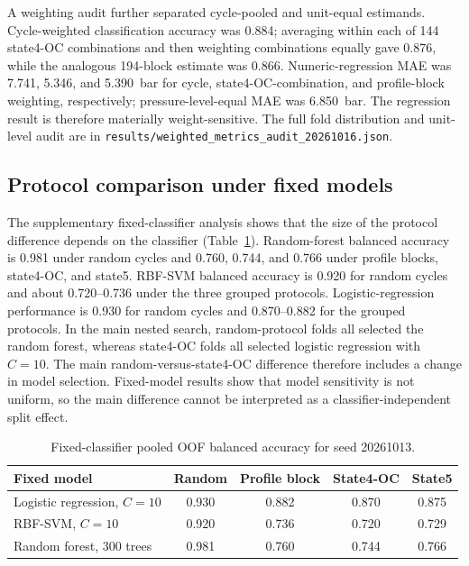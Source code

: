 \documentclass[11pt,a4paper]{article}
\newcommand{\code}[1]{\texttt{#1}}
\newcommand{\toprule}{\hline}
\newcommand{\midrule}{\hline}
\newcommand{\bottomrule}{\hline}
\begin{document}
A weighting audit further separated cycle-pooled and unit-equal estimands. Cycle-weighted classification accuracy was 0.884; averaging within each of 144 state4-OC combinations and then weighting combinations equally gave 0.876, while the analogous 194-block estimate was 0.866. Numeric-regression MAE was 7.741, 5.346, and 5.390~bar for cycle, state4-OC-combination, and profile-block weighting, respectively; pressure-level-equal MAE was 6.850~bar. The regression result is therefore materially weight-sensitive. The full fold distribution and unit-level audit are in \code{results/weighted\_metrics\_audit\_20261016.json}.

\subsection{Protocol comparison under fixed models}

The supplementary fixed-classifier analysis shows that the size of the protocol difference depends on the classifier (Table~\ref{tab:fixed}). Random-forest balanced accuracy is 0.981 under random cycles and 0.760, 0.744, and 0.766 under profile blocks, state4-OC, and state5. RBF-SVM balanced accuracy is 0.920 for random cycles and about 0.720--0.736 under the three grouped protocols. Logistic-regression performance is 0.930 for random cycles and 0.870--0.882 for the grouped protocols. In the main nested search, random-protocol folds all selected the random forest, whereas state4-OC folds all selected logistic regression with $C=10$. The main random-versus-state4-OC difference therefore includes a change in model selection. Fixed-model results show that model sensitivity is not uniform, so the main difference cannot be interpreted as a classifier-independent split effect.

\begin{table}[htbp]
\centering\small
\caption{Fixed-classifier pooled OOF balanced accuracy for seed 20261013.}
\label{tab:fixed}
\begin{tabular}{lcccc}
\toprule
Fixed model & Random & Profile block & State4-OC & State5\\
\midrule
Logistic regression, $C=10$ & 0.930 & 0.882 & 0.870 & 0.875\\
RBF-SVM, $C=10$ & 0.920 & 0.736 & 0.720 & 0.729\\
Random forest, 300 trees & 0.981 & 0.760 & 0.744 & 0.766\\
\bottomrule
\end{tabular}
\end{table}
\end{document}
